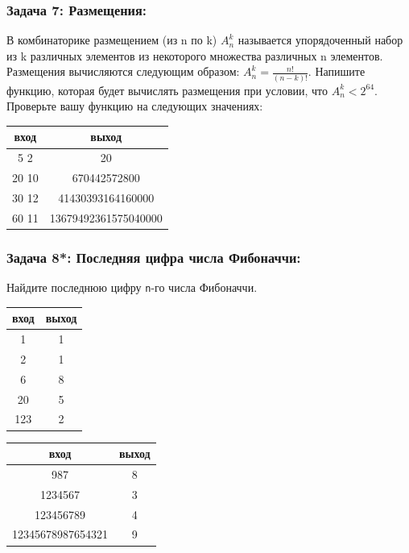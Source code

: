 \documentclass{article}
\begin{document}
\subsubsection*{Задача 7: Размещения:} В комбинаторике размещением (из n по k) $A_n^k$ называется упорядоченный набор из k различных элементов из некоторого множества различных n элементов. Размещения вычисляются следующим образом: $A_n^k = \frac{n!}{(n-k)!}$. Напишите функцию, которая будет вычислять размещения при условии, что  $A_n^k < 2^{64}$. Проверьте вашу функцию на следующих значениях:
\begin{center}
\begin{tabular}{ c c }
 вход & выход \\ \hline
 5 2 & 20  \\ 
 20 10 & 670442572800  \\ 
 30 12 & 41430393164160000 \\ 
 60 11 & 13679492361575040000 \\   
\end{tabular}
\end{center}


\subsubsection*{Задача 8\textbf{*}: Последняя цифра числа Фибоначчи:} Найдите последнюю цифру \texttt{n}-го числа Фибоначчи.
\begin{center}
\begin{multicols}{2}
\begin{tabular}{ c c }
 вход & выход \\ \hline
 1 & 1  \\ 
 2 & 1  \\ 
 6 & 8 \\  
 20 & 5 \\   
 123 & 2 \\   
\end{tabular}
\begin{tabular}{ c c }
 вход & выход \\ \hline
 987 & 8 \\  
 1234567 & 3  \\ 
 123456789 & 4 \\  
 12345678987654321 & 9 \\    
\end{tabular}
\end{multicols}
\end{center}
\end{document}
